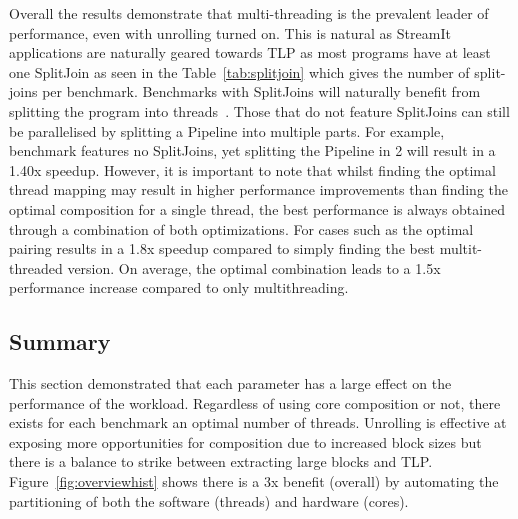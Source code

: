 Overall the results demonstrate that multi-threading is the prevalent leader of performance, even with unrolling turned on.
This is natural as StreamIt applications are naturally geared towards TLP as most programs have at least one SplitJoin as seen in the Table~\ref{tab:splitjoin} which gives the number of split-joins per benchmark.
Benchmarks with SplitJoins will naturally benefit from splitting the program into threads~\cite{thiesStreamit2010}.
Those that do not feature SplitJoins can still be parallelised by splitting a Pipeline into multiple parts.
For example, benchmark  features no SplitJoins, yet splitting the Pipeline in 2 will result in a 1.40x speedup.
However, it is important to note that whilst finding the optimal thread mapping may result in higher performance improvements than finding the optimal composition for a single thread, the best performance is always obtained through a combination of both optimizations.
For cases such as  the optimal pairing results in a 1.8x speedup compared to simply finding the best multit-threaded version.
On average, the optimal combination leads to a 1.5x performance increase compared to only multithreading.

\subsection{Summary}
This section demonstrated that each parameter has a large effect on the performance of the workload.
Regardless of using core composition or not, there exists for each benchmark an optimal number of threads.
Unrolling is effective at exposing more opportunities for composition due to increased block sizes but there is a balance to strike between extracting large blocks and TLP.
Figure~\ref{fig:overviewhist} shows there is a 3x benefit (overall) by automating the partitioning of both the software (threads) and hardware (cores).

